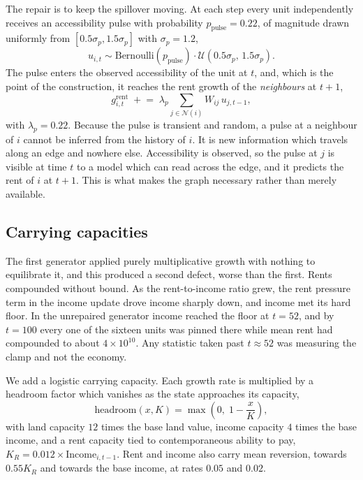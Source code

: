 \documentclass[journal]{IEEEtran}
\begin{document}
The repair is to keep the spillover moving. At each step every unit
independently receives an accessibility pulse with probability
$p_{\mathrm{pulse}} = 0.22$, of magnitude drawn uniformly from
$[0.5\sigma_p, 1.5\sigma_p]$ with $\sigma_p = 1.2$,
\begin{equation}
  u_{i,t} \sim \mathrm{Bernoulli}(p_{\mathrm{pulse}}) \cdot
                \mathcal{U}(0.5\sigma_p,\, 1.5\sigma_p).
  \label{eq:pulse}
\end{equation}
The pulse enters the observed accessibility of the unit at $t$, and, which is
the point of the construction, it reaches the rent growth of the
\emph{neighbours} at $t+1$,
\begin{equation}
  g^{\mathrm{rent}}_{i,t} \;\mathrel{+}=\; \lambda_p \sum_{j \in \mathcal{N}(i)}
  W_{ij} \, u_{j,t-1},
  \label{eq:pulse-transmission}
\end{equation}
with $\lambda_p = 0.22$. Because the pulse is transient and random, a pulse at a
neighbour of $i$ cannot be inferred from the history of $i$. It is new
information which travels along an edge and nowhere else. Accessibility is
observed, so the pulse at $j$ is visible at time $t$ to a model which can read
across the edge, and it predicts the rent of $i$ at $t+1$. This is what makes
the graph necessary rather than merely available.

\subsection{Carrying capacities}

The first generator applied purely multiplicative growth with nothing to
equilibrate it, and this produced a second defect, worse than the first. Rents
compounded without bound. As the rent-to-income ratio grew, the rent pressure
term in the income update drove income sharply down, and income met its hard
floor. In the unrepaired generator income reached the floor at $t = 52$, and by
$t = 100$ every one of the sixteen units was pinned there while mean rent had
compounded to about $4 \times 10^{10}$. Any statistic taken past $t \approx 52$
was measuring the clamp and not the economy.

We add a logistic carrying capacity. Each growth rate is multiplied by a
headroom factor which vanishes as the state approaches its capacity,
\begin{equation}
  \mathrm{headroom}(x, K) = \max\!\left(0,\; 1 - \frac{x}{K}\right),
  \label{eq:headroom}
\end{equation}
with land capacity $12$ times the base land value, income capacity $4$ times the
base income, and a rent capacity tied to contemporaneous ability to pay,
$K_R = 0.012 \times \mathrm{Income}_{i,t-1}$. Rent and income also carry mean
reversion, towards $0.55 K_R$ and towards the base income, at rates $0.05$ and
$0.02$.
\end{document}
